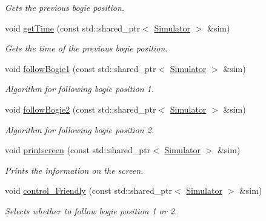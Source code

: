 \begin{DoxyCompactItemize}
\begin{DoxyCompactList}\small\item\em Gets the previous bogie position. \end{DoxyCompactList}\item 
void \hyperlink{classControl_a3b6bef77468a570abd762ce9bc2b5c15}{get\+Time} (const std\+::shared\+\_\+ptr$<$ \hyperlink{classSimulator}{Simulator} $>$ \&sim)\hypertarget{classControl_a3b6bef77468a570abd762ce9bc2b5c15}{}\label{classControl_a3b6bef77468a570abd762ce9bc2b5c15}

\begin{DoxyCompactList}\small\item\em Gets the time of the previous bogie position. \end{DoxyCompactList}\item 
void \hyperlink{classControl_a76af1a6f8d5b66435c3118d86a96b288}{follow\+Bogie1} (const std\+::shared\+\_\+ptr$<$ \hyperlink{classSimulator}{Simulator} $>$ \&sim)\hypertarget{classControl_a76af1a6f8d5b66435c3118d86a96b288}{}\label{classControl_a76af1a6f8d5b66435c3118d86a96b288}

\begin{DoxyCompactList}\small\item\em Algorithm for following bogie position 1. \end{DoxyCompactList}\item 
void \hyperlink{classControl_a1a0477f53f93d953755eab88df0f5f98}{follow\+Bogie2} (const std\+::shared\+\_\+ptr$<$ \hyperlink{classSimulator}{Simulator} $>$ \&sim)\hypertarget{classControl_a1a0477f53f93d953755eab88df0f5f98}{}\label{classControl_a1a0477f53f93d953755eab88df0f5f98}

\begin{DoxyCompactList}\small\item\em Algorithm for following bogie position 2. \end{DoxyCompactList}\item 
void \hyperlink{classControl_aa289dd351be2d4f2f5bc240472ce4ed3}{printscreen} (const std\+::shared\+\_\+ptr$<$ \hyperlink{classSimulator}{Simulator} $>$ \&sim)\hypertarget{classControl_aa289dd351be2d4f2f5bc240472ce4ed3}{}\label{classControl_aa289dd351be2d4f2f5bc240472ce4ed3}

\begin{DoxyCompactList}\small\item\em Prints the information on the screen. \end{DoxyCompactList}\item 
void \hyperlink{classControl_a1b5266175458d2ce81fe2d0ba3783e12}{control\+\_\+\+Friendly} (const std\+::shared\+\_\+ptr$<$ \hyperlink{classSimulator}{Simulator} $>$ \&sim)\hypertarget{classControl_a1b5266175458d2ce81fe2d0ba3783e12}{}\label{classControl_a1b5266175458d2ce81fe2d0ba3783e12}

\begin{DoxyCompactList}\small\item\em Selects whether to follow bogie position 1 or 2. \end{DoxyCompactList}\end{DoxyCompactItemize}


